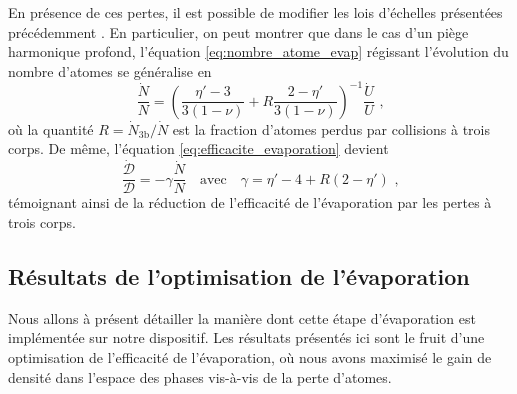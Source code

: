 En présence de ces pertes, il est possible de modifier les lois d'échelles présentées précédemment \citep{brantut2009manipulation,luiten1996kinetic}. En particulier, on peut montrer que dans le cas d'un piège harmonique profond, l'équation \ref{eq:nombre_atome_evap} régissant l'évolution du nombre d'atomes se généralise en
\begin{equation}
\frac{\dot{N}}{N}= \left( \frac{\eta'-3}{3(1-\nu)} + R \frac{2-\eta'}{3(1-\nu)} \right)^{-1} \frac{\dot{U}}{U} \text{ ,}
\label{eq:scaling_atomes_3corps}
\end{equation}
où la quantité $R=\dot{N}_{\mathrm{3b}}/\dot{N}$ est la fraction d'atomes perdus par collisions à trois corps. De même, l'équation \ref{eq:efficacite_evaporation} devient
\begin{equation}
\frac{\dot{\mathcal{D}}}{\mathcal{D}}=-\gamma \frac{\dot{N}}{N} \quad \text{avec} \quad \gamma=\eta'-4 + R(2-\eta') \text{ ,}
\label{eq:efficacite_evap_3corps}
\end{equation}
témoignant ainsi de la réduction de l'efficacité de l'évaporation par les pertes à trois corps.





\subsection{Résultats de l'optimisation de l'évaporation}
Nous allons à présent détailler la manière dont cette étape d'évaporation est implémentée sur notre dispositif. Les résultats présentés ici sont le fruit d'une optimisation de l'efficacité de l'évaporation, où nous avons maximisé le gain de densité dans l'espace des phases vis-à-vis de la perte d'atomes. %



